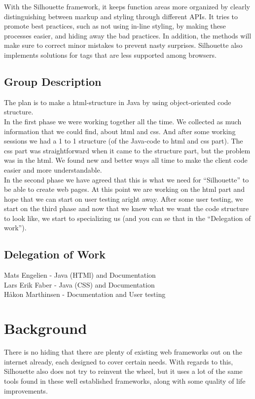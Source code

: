 \documentclass[12pt]{article}
\begin{document}
With the Silhouette framework, it keeps function areas more organized by clearly distinguishing between markup and styling through different APIs. It tries to promote best practices, such as not using in-line styling, by making these processes easier, and hiding away the bad practices. In addition, the methods will make sure to correct minor mistakes to prevent nasty surprises. Silhouette also implements solutions for tags that are less supported among browsers. 

    \subsection{Group Description}
    The plan is to make a html-structure in Java by using object-oriented code structure.\\
    In the first phase we were working together all the time. We collected as much information that we could find, about html and css. And after some working sessions we had a 1 to 1 structure (of the Java-code to html and css part). The css part was straightforward when it came to the structure part, but the problem was in the html. We found new and better ways all time to make the client code easier and more understandable.\\
    In the second phase we have agreed that this is what we need for “Silhouette” to be able to create web pages. At this point we are working on the html part and hope that we can start on user testing aright away. After some user testing, we start on the third phase and now that we knew what we want the code structure to look like, we start to specializing us (and you can se that in the “Delegation of work”). 

    \subsection{Delegation of Work}
    Mats Engelien - Java (HTMl) and Documentation\\
    Lars Erik Faber - Java (CSS) and Documentation\\
    Håkon Marthinsen - Documentation and User testing

\section{Background}

There is no hiding that there are plenty of existing web frameworks out on the internet already, each designed to cover certain needs. With regards to this, Silhouette also does not try to reinvent the wheel, but it uses a lot of the same tools found in these well established frameworks, along with some quality of life improvements.
\end{document}
